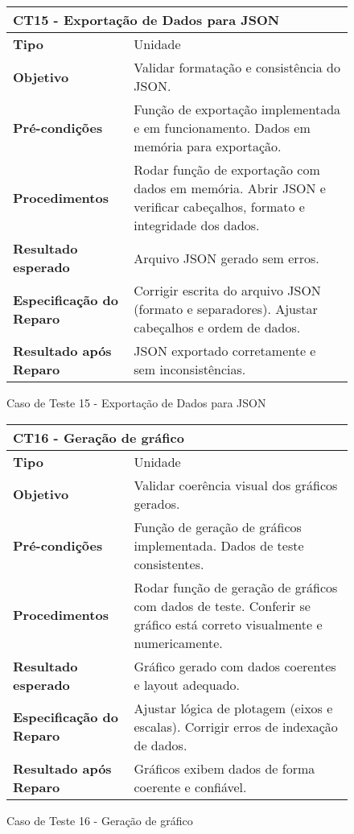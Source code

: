 \begin{figure}[H]
    \centering
\begin{longtable}{|p{}|p{}|}
\hline
\multicolumn{2}{|l|}{\textbf{CT15 - Exportação de Dados para JSON}} \\
\hline
\textbf{Tipo} & Unidade \\
\hline
\textbf{Objetivo} & Validar formatação e consistência do JSON. \\
\hline
\textbf{Pré-condições} & Função de exportação implementada e em funcionamento.  Dados em memória para exportação. \\
\hline
\textbf{Procedimentos} & Rodar função de exportação com dados em memória.  Abrir JSON e verificar cabeçalhos, formato e integridade dos dados. \\
\hline
\textbf{Resultado esperado} & Arquivo JSON gerado sem erros. \\
\hline
\textbf{Especificação do Reparo} & Corrigir escrita do arquivo JSON (formato e separadores).  Ajustar cabeçalhos e ordem de dados. \\
\hline
\textbf{Resultado após Reparo} & JSON exportado corretamente e sem inconsistências. \\
\hline
\end{longtable}
\caption{Caso de Teste 15 - Exportação de Dados para JSON}
\label{fig_ct12_exportacao_dados_csv}
\end{figure}

\begin{figure}[H]
    \centering
\begin{longtable}{|p{}|p{}|}
\hline
\multicolumn{2}{|l|}{\textbf{CT16 - Geração de gráfico}} \\
\hline
\textbf{Tipo} & Unidade \\
\hline
\textbf{Objetivo} & Validar coerência visual dos gráficos gerados. \\
\hline
\textbf{Pré-condições} & Função de geração de gráficos implementada.  Dados de teste consistentes.  \\
\hline
\textbf{Procedimentos} & Rodar função de geração de gráficos com dados de teste.  Conferir se gráfico está correto visualmente e numericamente.  \\
\hline
\textbf{Resultado esperado} & Gráfico gerado com dados coerentes e layout adequado. \\
\hline
\textbf{Especificação do Reparo} &  Ajustar lógica de plotagem (eixos e escalas).  Corrigir erros de indexação de dados.  \\
\hline
\textbf{Resultado após Reparo} & Gráficos exibem dados de forma coerente e confiável. \\
\hline
\end{longtable}
\caption{Caso de Teste 16 - Geração de gráfico}
\label{fig_ct13_geracao_grafico}
\end{figure}

